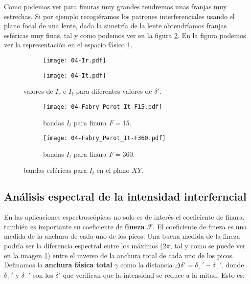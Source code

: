 \documentclass[12pt,a4paper]{book}
\numberwithin{equation}{section}
\numberwithin{figure}{section}
\newcommand{\1}{_{(1)}}
\newcommand{\2}{_{(2)}}
\theoremstyle{definition}
\begin{document}
Como podemos ver para finuras muy grandes tendremos unas franjas muy estrechas. Si por ejemplo recogiéramos los patrones interferenciales  usando el plano focal de una lente, dada la simetría de la lente obtendríamos franjas esféricas muy finas, tal y como podemos ver en la figura \ref{Fig:04.3-04}. En la figura podemos ver la representación en el espacio fásico \ref{Fig:04.3-03}. 


\begin{figure}[h!] \centering
\begin{subfigure}[m]{0.45\linewidth} \centering
\texttt{[image: 04-Ir.pdf]}
\end{subfigure}
\begin{subfigure}[m]{0.45\linewidth} \centering
\texttt{[image: 04-It.pdf]}
\end{subfigure}
\caption{valores de $I_r$ e $I_t$ para diferentes valores de $\delta'$.}
\label{Fig:04.3-03}
\end{figure}

\begin{figure}[h!] \centering
\begin{subfigure}[m]{0.45\linewidth} \centering
\texttt{[image: 04-Fabry\_Perot\_It-F15.pdf]}
\caption{bandas $I_t$ para finura $F=$15.}
\end{subfigure}
\begin{subfigure}[m]{0.45\linewidth} \centering
\texttt{[image: 04-Fabry\_Perot\_It-F360.pdf]}
\caption{bandas $I_t$ para finura $F=$360.}
\end{subfigure}
\caption{bandas esféricas para $I_t$ en el plano $XY$.}
\label{Fig:04.3-04}
\end{figure}



\subsection{Análisis espectral de la intensidad interferncial}

En las aplicaciones espectroscópicas no solo es de interés el coeficiente de finura, también es importante su coeficiente de \textbf{fineza} $\mathcal{F}$. El coeficiente de fineza es una medida de la anchura de cada uno de los picos. Una buena medida de la fineza podría ser la diferencia espectral entre los máximos ($2\pi$, tal y como se puede ver en la imagen \ref{Fig:04.3-03}) entre el inverso de la anchura total de cada uno de los picos. Definamos la \textbf{anchura fásica total} $\gamma$ como la distancia $\Delta \delta'=\delta_+'-\delta_-'$, donde $\delta_+'$ y $\delta_-'$ son los $\delta'$ que verifican que la intensidad se reduce a la mitad. Esto es:
\end{document}
